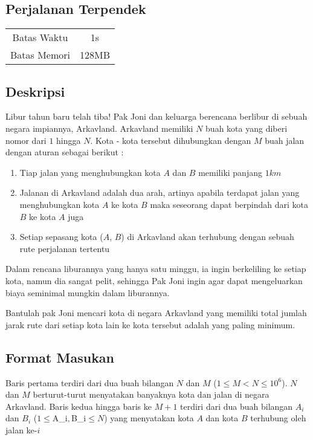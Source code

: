 \documentclass{article}
\begin{document}
\begin{center}
    \section*{Perjalanan Terpendek} %

    \begin{tabular}{ | c c | }
        \hline
        Batas Waktu  & 1s \\    %
        Batas Memori & 128MB \\  %
        \hline
    \end{tabular}
\end{center}

\subsection*{Deskripsi}

Libur tahun baru telah tiba! Pak Joni dan keluarga berencana berlibur di sebuah negara impiannya, Arkavland.
Arkavland memiliki $N$ buah kota yang diberi nomor dari $1$ hingga $N$. Kota - kota tersebut dihubungkan dengan $M$ buah jalan dengan aturan sebagai berikut :

\begin{enumerate}
    \setlength\itemsep{0pt}
    \item Tiap jalan yang menghubungkan kota $A$ dan $B$ memiliki panjang $1 km$
    \item Jalanan di Arkavland adalah dua arah, artinya apabila terdapat jalan yang menghubungkan kota $A$ ke kota $B$ maka seseorang dapat berpindah dari kota $B$ ke kota $A$ juga
    \item Setiap sepasang kota ($A$, $B$) di Arkavland akan terhubung dengan sebuah rute perjalanan tertentu
    
\end{enumerate}

Dalam rencana liburannya yang hanya satu minggu, ia ingin berkeliling ke setiap kota, namun dia sangat pelit, sehingga Pak Joni ingin agar dapat mengeluarkan biaya seminimal mungkin dalam liburannya. 

Bantulah pak Joni mencari kota di negara Arkavland yang memiliki total jumlah jarak rute dari setiap kota lain ke kota tersebut adalah yang paling minimum.

\subsection*{Format Masukan}
Baris pertama terdiri dari dua buah bilangan $N$ dan $M$ ($1 \leq M < N \leq 10^{6}$). $N$ dan $M$ berturut-turut menyatakan banyaknya kota dan jalan di negara Arkavland.
Baris kedua hingga baris ke $M + 1$ terdiri dari dua buah bilangan $A_i$ dan $B_i$ ($1 \leq $A_i$,$B_i$ \leq N$) yang menyatakan kota $A$ dan kota $B$ terhubung oleh jalan ke-$i$
\end{document}
